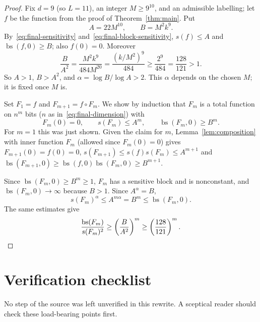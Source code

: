\documentclass[11pt]{article}
\newcommand{\bs}{\operatorname{bs}}
\theoremstyle{definition}
\theoremstyle{remark}
\begin{document}
\begin{proof}
Fix $d=9$ (so $L=11$), an integer $M\geq9^{10}$, and an admissible
labelling; let $f$ be the function from the proof of
Theorem~\ref{thm:main}. Put
\[
 A=22M^{10},\qquad B=M^2k^9.
\]
By~\eqref{eq:final-sensitivity} and~\eqref{eq:final-block-sensitivity},
$s(f)\leq A$ and $\bs(f,0)\geq B$; also $f(0)=0$. Moreover
\[
 \frac{B}{A^2}
   =\frac{M^2k^9}{484M^{20}}
   =\frac{(k/M^2)^9}{484}
   \geq\frac{2^9}{484}
   =\frac{128}{121}>1.
\]
So $A>1$, $B>A^2$, and $\alpha=\log B/\log A>2$. This $\alpha$ depends on the
chosen $M$; it is fixed once $M$ is.

Set $F_1=f$ and $F_{m+1}=f\circ F_m$. We show by induction that $F_m$ is a
total function on $n^m$ bits ($n$ as in~\eqref{eq:final-dimension}) with
\[
 F_m(0)=0,\qquad s(F_m)\leq A^m,\qquad \bs(F_m,0)\geq B^m.
\]
For $m=1$ this was just shown. Given the claim for $m$,
Lemma~\ref{lem:composition} with inner function $F_m$ (allowed since
$F_m(0)=0$) gives $F_{m+1}(0)=f(0)=0$,
$s(F_{m+1})\le s(f)s(F_m)\le A^{m+1}$ and
$\bs(F_{m+1},0)\ge\bs(f,0)\bs(F_m,0)\ge B^{m+1}$.

Since $\bs(F_m,0)\ge B^m\ge1$, $F_m$ has a sensitive block and is
nonconstant, and $\bs(F_m,0)\to\infty$ because $B>1$. Since $A^\alpha=B$,
\[
 s(F_m)^\alpha\leq A^{m\alpha}=B^m\leq\bs(F_m,0).
\]
The same estimates give
\[
 \frac{\bs(F_m)}{s(F_m)^2}
 \geq\left(\frac{B}{A^2}\right)^m
 \geq\left(\frac{128}{121}\right)^m.\qedhere
\]
\end{proof}

\section{Verification checklist}

No step of the source was left unverified in this rewrite. A sceptical reader
should check these load-bearing points first.
\end{document}
